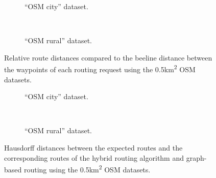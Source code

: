			\begin{figure}[h!]
				\begin{subfigure}[t]{\linewidth}
					\begin{figcenter}
						
					\end{figcenter}
					\caption{\enquote{OSM city} dataset.}
					\label{fig:eval-route-distances-city}
				\end{subfigure}
				\\[3ex]
				\begin{subfigure}[t]{\linewidth}
					\begin{figcenter}
						
					\end{figcenter}
					\caption{\enquote{OSM rural} dataset.}
					\label{fig:eval-route-distances-rural}
				\end{subfigure}
				\caption[Relative route distance comparison.]{Relative route distances compared to the beeline distance between the waypoints of each routing request using the 0.5km\textsuperscript{2} OSM datasets.}
				\label{fig:eval-route-distances}
				\vspace{3ex}
				
				\begin{subfigure}[t]{\linewidth}
					\begin{figcenter}
						
					\end{figcenter}
					\caption{\enquote{OSM city} dataset.}
					\label{fig:eval-hausdorff-city}
				\end{subfigure}
				\\[3ex]
				\begin{subfigure}[t]{\linewidth}
					\begin{figcenter}
						
					\end{figcenter}
					\caption{\enquote{OSM rural} dataset.}
					\label{fig:eval-hausdorff-rural}
				\end{subfigure}
				\caption[Hausdorff distance comparison.]{Hausdorff distances between the expected routes and the corresponding routes of the hybrid routing algorithm and graph-based routing using the 0.5km\textsuperscript{2} OSM datasets.}
				\label{fig:eval-hausdorff}
			\end{figure}

